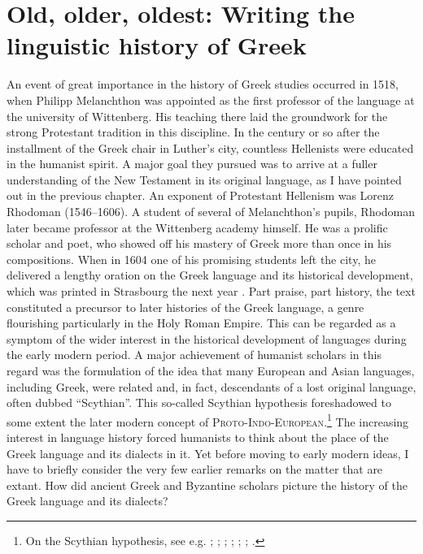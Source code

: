 \chapter{Old, older, oldest: Writing the linguistic history of Greek}\label{chap:5}

An event of great importance in the history of Greek studies occurred in 1518, when Philipp Melanchthon was appointed as the first professor of the language at the university of Wittenberg. His teaching there laid the groundwork for the strong Protestant tradition in this discipline. In the century or so after the installment of the Greek chair in Luther’s city, countless Hellenists were educated in the humanist spirit. A major goal they pursued was to arrive at a fuller understanding of the New Testament in its original language, as I have pointed out in the previous chapter. An exponent of Protestant Hellenism was Lorenz Rhodoman (1546–1606). A student of several of Melanchthon’s pupils, Rhodoman later became professor at the Wittenberg academy himself. He was a prolific scholar and poet, who showed off his mastery of Greek more than once in his compositions. When in 1604 one of his promising students left the city, he delivered a lengthy oration on the Greek language and its historical development, which was printed in Strasbourg the next year \citep{Rhodomanus1605}. Part praise, part history, the text constituted a precursor to later histories of the Greek language, a genre flourishing particularly in the Holy Roman Empire. This can be regarded as a symptom of the wider interest in the historical development of languages during the early modern period. A major achievement of humanist scholars in this regard was the formulation of the idea that many European and Asian languages, including Greek, were related and, in fact, descendants of a lost original language, often dubbed “Scythian”. This so-called Scythian hypothesis foreshadowed to some extent the later modern concept of \textsc{Proto-Indo-European}.\footnote{On the Scythian hypothesis, see e.g. \citet[34--39]{Metcalf2013}; \citet{Droixhe1980}; \citet[]{Swiggers1984, Swiggers1998}; \citet{Villani2003}; \citet{Considine2010}; \citet[esp. 335–401, 473–475]{VanHal2010a}; \citet[]{VanHal2010b}.} The increasing interest in language history forced humanists to think about the place of the Greek language and its dialects in it. Yet before moving to early modern ideas, I have to briefly consider the very few earlier remarks on the matter that are extant. How did ancient Greek and Byzantine scholars picture the history of the Greek language and its dialects?

